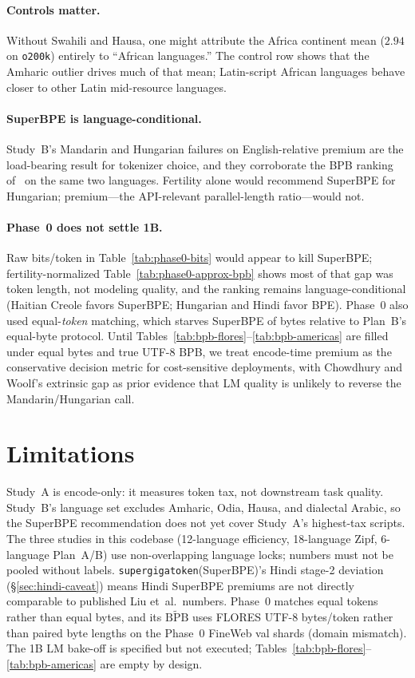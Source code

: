 \documentclass[11pt,a4paper]{article}
\begin{document}
\paragraph{Controls matter.}
Without Swahili and Hausa, one might attribute the Africa continent mean ($2.94$ on \texttt{o200k}) entirely to ``African languages.''
The control row shows that the Amharic outlier drives much of that mean; Latin-script African languages behave closer to other Latin mid-resource languages.

\paragraph{SuperBPE is language-conditional.}
Study~B's Mandarin and Hungarian failures on English-relative premium are the load-bearing result for tokenizer choice, and they corroborate the BPB ranking of~\citet{chowdhury-woolf-2026-benchmarking} on the same two languages.
Fertility alone would recommend SuperBPE for Hungarian; premium---the API-relevant parallel-length ratio---would not.

\paragraph{Phase~0 does not settle 1B.}
Raw bits/token in Table~\ref{tab:phase0-bits} would appear to kill SuperBPE; fertility-normalized Table~\ref{tab:phase0-approx-bpb} shows most of that gap was token length, not modeling quality, and the ranking remains language-conditional (Haitian Creole favors SuperBPE; Hungarian and Hindi favor BPE).
Phase~0 also used equal-\emph{token} matching, which starves SuperBPE of bytes relative to Plan~B's equal-byte protocol.
Until Tables~\ref{tab:bpb-flores}--\ref{tab:bpb-americas} are filled under equal bytes and true UTF-8 BPB, we treat encode-time premium as the conservative decision metric for cost-sensitive deployments, with Chowdhury and Woolf's extrinsic gap as prior evidence that LM quality is unlikely to reverse the Mandarin/Hungarian call.

\section{Limitations}
\label{sec:limitations}

Study~A is encode-only: it measures token tax, not downstream task quality.
Study~B's language set excludes Amharic, Odia, Hausa, and dialectal Arabic, so the SuperBPE recommendation does not yet cover Study~A's highest-tax scripts.
The three studies in this codebase (12-language efficiency, 18-language Zipf, 6-language Plan~A/B) use non-overlapping language locks; numbers must not be pooled without labels.
\texttt{supergigatoken}(SuperBPE)'s Hindi stage-2 deviation (\S\ref{sec:hindi-caveat}) means Hindi SuperBPE premiums are not directly comparable to published Liu et~al.\ numbers.
Phase~0 matches equal tokens rather than equal bytes, and its $\widetilde{\mathrm{BPB}}$ uses FLORES UTF-8 bytes/token rather than paired byte lengths on the Phase~0 FineWeb val shards (domain mismatch).
The 1B LM bake-off is specified but not executed; Tables~\ref{tab:bpb-flores}--\ref{tab:bpb-americas} are empty by design.
\end{document}
